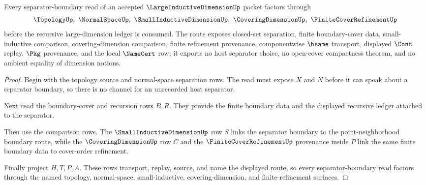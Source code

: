 \begin{theorem}
\label{thm:large-inductive-dimension-separator-route}
Every separator-boundary read of an accepted $\LargeInductiveDimensionUp$ packet factors through
$$
\TopologyUp,\ \NormalSpaceUp,\ \SmallInductiveDimensionUp,\ \CoveringDimensionUp,\ \FiniteCoverRefinementUp
$$
before the recursive large-dimension ledger is consumed. The route exposes closed-set separation, finite boundary-cover data, small-inductive comparison, covering-dimension comparison, finite refinement provenance, componentwise $\hsame$ transport, displayed $\Cont$ replay, $\Pkg$ provenance, and the local $\NameCert$ row; it exports no host separator choice, no open-cover compactness theorem, and no ambient equality of dimension notions.
\end{theorem}
\begin{proof}
Begin with the topology source and normal-space separation rows. The read must expose $X$ and $N$ before it can speak about a separator boundary, so there is no channel for an unrecorded host separator.

Next read the boundary-cover and recursion rows $B,R$. They provide the finite boundary data and the displayed recursive ledger attached to the separator.

Then use the comparison rows. The $\SmallInductiveDimensionUp$ row $S$ links the separator boundary to the point-neighborhood boundary route, while the $\CoveringDimensionUp$ row $C$ and the $\FiniteCoverRefinementUp$ provenance inside $P$ link the same finite boundary data to cover-order refinement.

Finally project $H,T,P,A$. These rows transport, replay, source, and name the displayed route, so every separator-boundary read factors through the named topology, normal-space, small-inductive, covering-dimension, and finite-refinement surfaces.
\end{proof}



